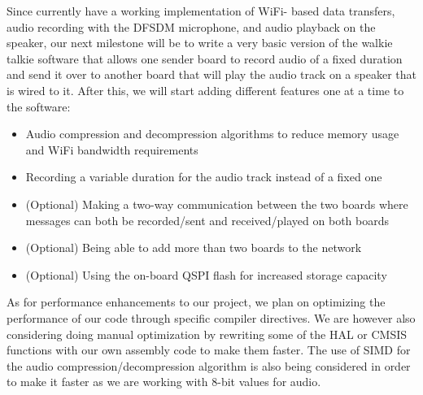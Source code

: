 \documentclass[journal]{IEEEtran}
\begin{document}
Since currently have a working implementation of WiFi- based data transfers, audio recording with the DFSDM microphone, and audio playback on the speaker, our next milestone will be to write a very basic version of the walkie talkie software that allows one sender board to record audio of a fixed duration and send it over to another board that will play the audio track on a speaker that is wired to it. After this, we will start adding different features one at a time to the software:
\vspace{10pt}

\begin{itemize}
    \item Audio compression and decompression algorithms to reduce memory usage and WiFi bandwidth requirements

    \item Recording a variable duration for the audio track instead of a fixed one

    \item (Optional) Making a two-way communication between the two boards where messages can both be recorded/sent and received/played on both boards

    \item (Optional) Being able to add more than two boards to the network

    \item (Optional) Using the on-board QSPI flash for increased storage capacity
    
\end{itemize}
\vspace{10pt}

As for performance enhancements to our project, we plan on optimizing the performance of our code through specific compiler directives. We are however also considering doing manual optimization by rewriting some of the HAL or CMSIS functions with our own assembly code to make them faster. The use of SIMD for the audio compression/decompression algorithm is also being considered in order to make it faster as we are working with 8-bit values for audio.
\end{document}
